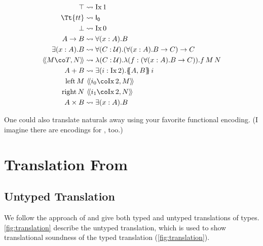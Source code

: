 \documentclass[authoryear,acmsmall,screen]{acmart}
\newcommand\FZero{\mathsf{I_0}}
\newcommand\Ix[1]{\mathrm{Ix} \, #1}
\renewcommand\tt{\Tt{tt}}
\newcommand\TyPair[3]{\ensuremath{\langle\!\langle #1 \co #2 , #3 \rangle\!\rangle}}
\newcommand\U{\mathcal{U}}
\renewcommand\left{\mathrm{left}}
\renewcommand\right{\mathrm{right}}
\newcommand\Felim[1]{\{\!\!\{#1\}\!\!\}}
\begin{document}
\begin{align*}
  \top &\leadsto \Ix 1 \\
  \tt &\leadsto  \FZero \\
  \bot &\leadsto \Ix 0 \\
  A \to B &\leadsto \forall (x : A). B \\
  \exists(x : A). B &\leadsto \forall (C : \U).(\forall (x : A). B \to C) \to C \\
  \TyPair M T N &\leadsto \lambda (C : \U). \lambda (f : (\forall (x : A). B \to C)). f \, M \, N \\
  A + B &\leadsto \exists (i : \Ix 2). \Felim {A,B} \, i \\
  \left\, M &\ \TyPair {i_0} {\Ix 2} {M} \\
  \right\, N &\ \TyPair {i_1} {\Ix 2} {N} \\
  A \times B &\leadsto \exists (x : A). B
\end{align*}

One could also translate naturals away using your favorite functional encoding. (I imagine there are encodings for , too.)

\section{Translation From \RO}

\subsection{Untyped Translation}

We follow the approach of \cite{MorrisM19} and give both typed and untyped translations of \RO types. \cref{fig:translation} describe the untyped translation, which is used to show translational soundness of the typed translation (\cref{fig:translation}).
\end{document}
